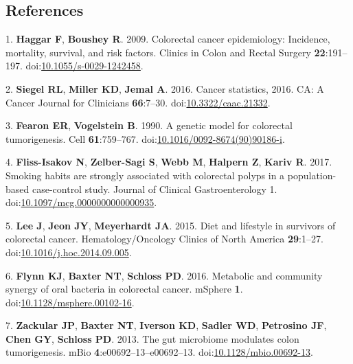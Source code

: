 \documentclass[11pt,]{article}
\begin{document}
\newpage

\hypertarget{references}{%
\subsection{References}\label{references}}

\hypertarget{refs}{}
\leavevmode\hypertarget{ref-Haggar2009}{}%
1. \textbf{Haggar F}, \textbf{Boushey R}. 2009. Colorectal cancer
epidemiology: Incidence, mortality, survival, and risk factors. Clinics
in Colon and Rectal Surgery \textbf{22}:191--197.
doi:\href{https://doi.org/10.1055/s-0029-1242458}{10.1055/s-0029-1242458}.

\leavevmode\hypertarget{ref-Siegel2016}{}%
2. \textbf{Siegel RL}, \textbf{Miller KD}, \textbf{Jemal A}. 2016.
Cancer statistics, 2016. CA: A Cancer Journal for Clinicians
\textbf{66}:7--30.
doi:\href{https://doi.org/10.3322/caac.21332}{10.3322/caac.21332}.

\leavevmode\hypertarget{ref-Fearon1990}{}%
3. \textbf{Fearon ER}, \textbf{Vogelstein B}. 1990. A genetic model for
colorectal tumorigenesis. Cell \textbf{61}:759--767.
doi:\href{https://doi.org/10.1016/0092-8674(90)90186-i}{10.1016/0092-8674(90)90186-i}.

\leavevmode\hypertarget{ref-FlissIsakov2017}{}%
4. \textbf{Fliss-Isakov N}, \textbf{Zelber-Sagi S}, \textbf{Webb M},
\textbf{Halpern Z}, \textbf{Kariv R}. 2017. Smoking habits are strongly
associated with colorectal polyps in a population-based case-control
study. Journal of Clinical Gastroenterology 1.
doi:\href{https://doi.org/10.1097/mcg.0000000000000935}{10.1097/mcg.0000000000000935}.

\leavevmode\hypertarget{ref-Lee2015}{}%
5. \textbf{Lee J}, \textbf{Jeon JY}, \textbf{Meyerhardt JA}. 2015. Diet
and lifestyle in survivors of colorectal cancer. Hematology/Oncology
Clinics of North America \textbf{29}:1--27.
doi:\href{https://doi.org/10.1016/j.hoc.2014.09.005}{10.1016/j.hoc.2014.09.005}.

\leavevmode\hypertarget{ref-Flynn2016}{}%
6. \textbf{Flynn KJ}, \textbf{Baxter NT}, \textbf{Schloss PD}. 2016.
Metabolic and community synergy of oral bacteria in colorectal cancer.
mSphere \textbf{1}.
doi:\href{https://doi.org/10.1128/msphere.00102-16}{10.1128/msphere.00102-16}.

\leavevmode\hypertarget{ref-Zackular2013}{}%
7. \textbf{Zackular JP}, \textbf{Baxter NT}, \textbf{Iverson KD},
\textbf{Sadler WD}, \textbf{Petrosino JF}, \textbf{Chen GY},
\textbf{Schloss PD}. 2013. The gut microbiome modulates colon
tumorigenesis. mBio \textbf{4}:e00692--13--e00692--13.
doi:\href{https://doi.org/10.1128/mbio.00692-13}{10.1128/mbio.00692-13}.
\end{document}
